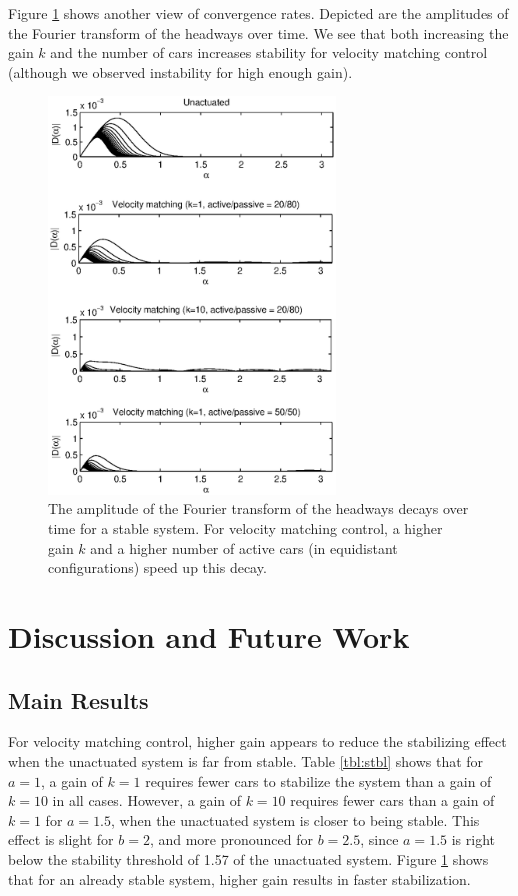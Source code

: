 \documentclass[10pt,twocolumn]{article}
\theoremstyle{ss}
\newcommand{\lm}{\fontfamily{\sfdefault}\selectfont}
\begin{document}
Figure \ref{fig:absfft} shows another view of convergence rates. Depicted are the amplitudes of the Fourier transform of the headways over time. We see that both increasing the gain $k$ and the number of cars increases stability for velocity matching control (although we observed instability for high enough gain).
\begin{figure}[!h]
\lm
\begin{center}
\includegraphics[width=3in]{absfft}
\end{center}
\caption{ \label{fig:absfft} The amplitude of the Fourier transform of the headways decays over time for a stable system. For velocity matching control, a higher gain $k$ and a higher number of active cars (in equidistant configurations) speed up this decay.}
\end{figure}

\section{Discussion and Future Work}

\subsection{Main Results}
For velocity matching control, higher gain appears to reduce the stabilizing effect when the unactuated system is far from stable. Table \ref{tbl:stbl} shows that for $a=1$, a gain of $k=1$ requires fewer cars to stabilize the system than a gain of $k=10$ in all cases. However, a gain of $k=10$ requires fewer cars than a gain of $k=1$ for $a=1.5$, when the unactuated system is closer to being stable. This effect is slight for $b=2$, and more pronounced for $b=2.5$, since $a=1.5$ is right below the stability threshold of 1.57 of the unactuated system. Figure \ref{fig:absfft} shows that for an already stable system, higher gain results in faster stabilization.
\end{document}

